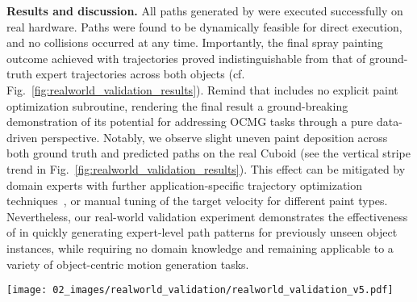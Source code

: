 \noindent \textbf{Results and discussion.}
All paths generated by \ours were executed successfully on real hardware.
Paths were found to be dynamically feasible for direct execution, and no collisions occurred at any time.
%
Importantly, the final spray painting outcome achieved with \ours trajectories proved indistinguishable from that of ground-truth expert trajectories across both objects (cf. Fig.~\ref{fig:realworld_validation_results}).
Remind that \ours includes no explicit paint optimization subroutine, rendering the final result a ground-breaking demonstration of its potential for addressing OCMG tasks through a pure data-driven perspective.
%
Notably, we observe slight uneven paint deposition across both ground truth and predicted paths on the real Cuboid (see the vertical stripe trend in Fig.~\ref{fig:realworld_validation_results}).
This effect can be mitigated by domain experts with further application-specific trajectory optimization techniques~\cite{gleeson2022generating}, or manual tuning of the target velocity for different paint types.
%
Nevertheless, our real-world validation experiment demonstrates the effectiveness of \ours in quickly generating expert-level path patterns for previously unseen object instances, while requiring no domain knowledge and remaining applicable to a variety of object-centric motion generation tasks.

\begin{figure*}[!t]
    \centering
    \texttt{[image: 02\_images/realworld\_validation/realworld\_validation\_v5.pdf]}
    \vspace{-12pt}
    \caption{
    Real-world validation of \ours on two test objects. A set of long-horizon paths is inferred given the object point clouds through a single forward pass ($100ms$) and a postprocessing step ($100ms$). Then, paths are checked for kinematic and dynamic feasibility in simulation and later executed on the real setup.
    The final paint result on the real objects is effectively equivalent to that produced by ground truth paths.
    }
    \label{fig:realworld_validation_results}
\end{figure*}